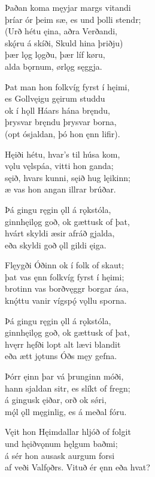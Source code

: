 \bva Þaðan koma męyjar \hld margs vitandi \\
þríar ór þeim sæ, \hld es und þolli stendr; \\
(Urð hétu ęina, \hld aðra Verðandi, \\
skǫ́ru á skíði, \hld Skuld hina þriðju) \\
þær lǫg lǫgðu, \hld þær líf køru, \\
alda bǫrnum, \hld ørlǫg sęggja.

\bva Þat man hon folkvíg \hld fyrst í hęimi, \\
es Gollvęigu \hld gęirum studdu \\
ok í hǫll Háars \hld hána bręndu, \\
þrysvar bręndu \hld þrysvar borna, \\
(opt ósjaldan, \hld þó hon ęnn lifir).

\bva Hęiði hétu, \hld hvar's til húsa kom, \\
vǫlu vęlspáa, \hld vitti hon ganda; \\
sęið, hvars kunni, \hld sęið hug lęikinn; \\
æ vas hon angan \hld illrar brúðar.

\bva Þá gingu ręgin ǫll \hld á rǫkstóla, \\
ginnhęilǫg goð, \hld ok gættusk of þat, \\
hvárt skyldi æsir \hld afráð gjalda, \\
eða skyldi goð ǫll \hld gildi ęiga.

\bva Flęygði Óðinn \hld ok í folk of skaut; \\
þat vas ęnn folkvíg \hld fyrst í hęimi; \\
brotinn vas borðvęggr \hld borgar ása, \\
knǫ́ttu vanir vígspǫ́ \hld vǫllu sporna.

\bva Þá gingu ręgin ǫll \hld á rǫkstóla, \\
ginnhęilǫg goð, \hld ok gættusk of þat, \\
hvęrr hęfði lopt alt \hld lævi blandit \\
eða ætt jǫtuns \hld Óðs męy gefna.

\bva Þórr ęinn þar vá \hld þrunginn móði, \\
hann sjaldan sitr, \hld es slíkt of fregn; \\
á gingusk ęiðar, \hld orð ok sǿri, \\
mǫ́l ǫll męginlig, \hld es á meðal fóru.

\bva Vęit hon Hęimdallar \hld hljóð of folgit \\
und hęiðvǫnum \hld hęlgum baðmi; \\
á sér hon ausask \hld aurgum forsi \\
af veði Valfǫðrs. \hld Vituð ér ęnn eða hvat?


